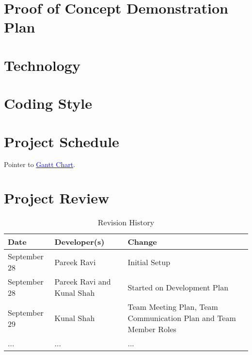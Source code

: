 \documentclass{article}
\begin{document}
\section{Proof of Concept Demonstration Plan}

\section{Technology}

\section{Coding Style}

\section{Project Schedule}

Pointer to \href{run:Gantt Chart.gan}{\textcolor{blue}{Gantt Chart}}.

\section{Project Review}

\newpage

\begin{table}[hp]
\caption{Revision History} \label{TblRevisionHistory}
\begin{tabularx}{\textwidth}{llX}
\toprule
\textbf{Date} & \textbf{Developer(s)} & \textbf{Change}\\
\midrule
September 28 & Pareek Ravi & Initial Setup\\
September 28 & Pareek Ravi and Kunal Shah & Started on Development Plan\\
September 29 & Kunal Shah & Team Meeting Plan, Team Communication Plan and Team Member Roles\\
... & ... & ...\\
\bottomrule
\end{tabularx}
\end{table}
\end{document}
